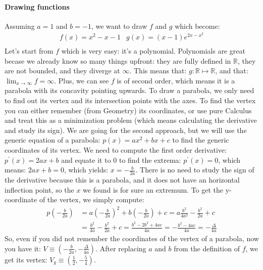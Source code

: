 \paragraph[Problem 3]{Drawing functions}
\label{par:subp3_1}
Assuming $a = 1$ and $b = -1$, we want to draw $f$ and $g$ which become:
\begin{equation*}
    \begin{array}{cc}
        f(x) = x^2 - x -1 & g(x) = (x - 1)e^{2x - x^2} \\
    \end{array}
\end{equation*}
Let's start from $f$ which is very easy: it's a polynomial. Polynomials
are great becase we already know so many things upfront: they are
fully defined in $\mathbb{R}$, they are not
bounded,
and they diverge at $\infty$. This means
that: $g : \mathbb{R} \mapsto \mathbb{R}$, and that:
$\lim_{x \to \infty} f = \infty$. Plus, we can see $f$ is of second order,
which means it is a parabola with its concavity pointing
upwards. To draw a parabola, we only need
to find out its vertex and its intersection points with the axes.
To find the vertex you can either remember (from Geometry) its coordinates,
or use pure Calculus and treat this as a
minimization problem (which means calculating the derivative
and study its sign). We are going for the second approach, but we will use
the generic equation of a parabola: $p(x) = ax^2 + bx + c$ to
find the generic coordinates of its vertex. We need to compute the first
order derivative: $p^\prime(x) = 2ax + b$ and equate it to $0$ to find
the extrema: $p^\prime(x) = 0$, which means: $2ax + b = 0$, which yields:
$x = -\frac{b}{2a}$. There is no need to study the sign of the derivative
because this is a parabola, and it does not have an horizontal inflection
point, so the $x$ we found is for sure an extremum.
To get the y-coordinate of the vertex, we simply compute:
\begin{equation*}
    \begin{split}
        p\left( -\frac{b}{2a} \right) &=
        a \left( -\frac{b}{2a} \right)^2 + b \left( -\frac{b}{2a} \right) + c =
        a \frac{b^2}{4a^2} - \frac{b^2}{2a} + c\\
        &= \frac{b^2}{4a} - \frac{b^2}{2a} + c = \frac{b^2 - 2b^2 + 4ac}{4a} =
        - \frac{b^2 - 4ac}{4a} = - \frac{\Delta}{4a}
    \end{split}
\end{equation*}
So, even if you did not remember the coordinates of the vertex
of a parabola, now you have
it: $V \equiv \left( -\frac{b}{2a}, - \frac{\Delta}{4a} \right)$.
After replacing $a$ and $b$ from the definition of $f$, we get its vertex:
$V_g \equiv \left( \frac{1}{2}, - \frac{5}{4} \right)$.